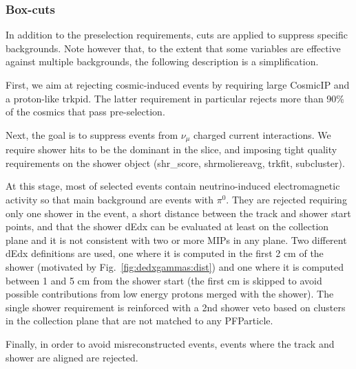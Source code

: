 \documentclass[a4paper]{article}
\begin{document}
\subsubsection{Box-cuts}

In addition to the preselection requirements, cuts are applied to suppress specific backgrounds. Note however that, to the extent that some variables are effective against multiple backgrounds, the following description is a simplification.

First, we aim at rejecting cosmic-induced events by requiring large CosmicIP and a proton-like trkpid. The latter requirement in particular rejects more than 90\% of the cosmics that pass pre-selection.

Next, the goal is to suppress events from $\nu_\mu$ charged current interactions. We require shower hits to be the dominant in the slice, and imposing tight quality requirements on the shower object (shr\_score, shrmoliereavg, trkfit, subcluster).

At this stage, most of selected events contain neutrino-induced electromagnetic activity so that main background are events with $\pi^0$. They are rejected requiring only one shower in the event, a short distance between the track and shower start points, and that the shower dEdx can be evaluated at least on the collection plane and it is not consistent with two or more MIPs in any plane. Two different dEdx definitions are used, one where it is computed in the first 2 cm of the shower (motivated by Fig.~\ref{fig:dedxgammas:dist}) and one where it is computed between 1 and 5 cm from the shower start (the first cm is skipped to avoid possible contributions from low energy protons merged with the shower). The single shower requirement is reinforced with a 2nd shower veto based on clusters in the collection plane that are not matched to any PFParticle.

Finally, in order to avoid misreconstructed events, events where the track and shower are aligned are rejected.
\end{document}

